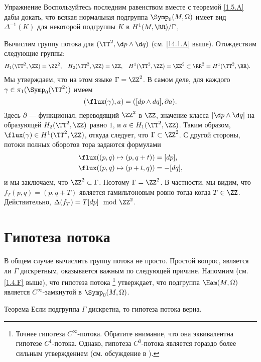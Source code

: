 \begin{ex}{Упражнение}\label{14.1.B}
Воспользуйтесь последним равенством вместе с теоремой \ref{1.5.A} дабы докать, что всякая нормальная подгруппа $\Symp_0(M,\Omega)$ имеет вид $\Delta^{-1}(K)$ для некоторой подгруппы $K$ в $H^1(M, \RR)/\Gamma$,
\end{ex}

Вычислим группу потока для $(\TT^2,\d p\wedge \d q)$ (см. \ref{14.1.A} выше).
Отождествим следующие группы: 
\begin{align*}
H_1(\TT^2,\ZZ)&=\ZZ^2,
&
H_2(\TT^2,\ZZ)&=\ZZ,
&
H^1(\TT^2,\ZZ)&=\ZZ^2
\subset
\RR^2=
H^1(\TT^2,\RR).
\end{align*}
Мы утверждаем, что на этом языке $\Gamma = \ZZ^2$.
В самом деле, для каждого $\gamma\in\pi_1(\Symp_0(\TT^2))$ имеем 
\[(\flux(\gamma), a) = ([dp \wedge dq], \partial a).\]
Здесь $\partial$ — функционал, переводящий $\ZZ^2$ в $\ZZ$, значение
класса $[\d p \wedge \d q]$ на образующей $H_2 (\TT^2,\ZZ)$ равно $1$,
и $a \in H_1 (\TT^2, \ZZ)$. 
Таким образом, $\flux(\gamma)\in H^1(\TT^2,\ZZ)$, откуда следует, что
$\Gamma\subset \ZZ^2$.
С другой стороны, потоки полных оборотов тора задаются формулами 
\begin{align*}
\flux( (p, q) \mapsto (p , q+ t))
&=
[dp],
\\
\flux( (p, q) \mapsto (p+ t , q))
&=
-[dq],
\end{align*}
и мы заключаем, что $\ZZ^2 \subset  \Gamma$.
Поэтому $\Gamma = \ZZ^2$.
В частности, мы видим, что $f_T(p, q) = (p, q + T)$ является
гамильтоновым ровно тогда когда $T \in \ZZ$. 
Действительно, $\Delta(f_T) = T[dp] \mod{\ZZ^2}$.

\section{Гипотеза потока}

В общем случае вычислить группу потока не просто. 
Простой вопрос, является ли $\Gamma$ дискретным, оказывается важным по
следующей причине. 
Напомним (см. \ref{1.4.F} выше), что гипотеза потока%
\footnote{Точнее гипотеза $C^\infty$-потока.
Обратите внимание, что она эквивалентна гипотезе $C^1$-потока.
Однако, гипотеза $C^0$-потока является гораздо более сильным утверждением (см. обсуждение в \cite{LMP1}).}
утверждает, что подгруппа $\Ham(M,\Omega)$ является $C^\infty$-замкнутой в $\Symp_0(M,\Omega)$.

\begin{thm}{Теорема}\label{14.2.A}
Если подгруппа $\Gamma$ дискретна, то гипотеза потока верна. 
\end{thm}

